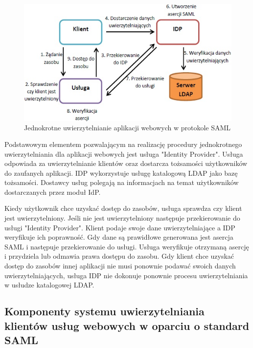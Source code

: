 		\begin{figure}[h]
			\centering
			\includegraphics{img/samlWebSSO.jpg}
			\caption{Jednokrotne uwierzytelnianie aplikacji webowych w protokole SAML}
			\label{Jednokrotne uwierzytelnianie aplikacji webowych w protokole SAML}
		\end{figure}

		Podstawowym elementem pozwalającym na realizację procedury jednokrotnego uwierzytelniania dla aplikacji webowych jest usługa "Identity Provider". Usługa odpowiada za uwierzytelnianie klientów oraz dostarcza tożsamości użytkowników do zaufanych aplikacji. IDP wykorzystuje usługę katalogową LDAP jako bazę tożsamości. Dostawcy usług polegają na informacjach na temat użytkowników dostarczanych przez moduł IdP. 

		Kiedy użytkownik chce uzyskać dostęp do zasobów, usługa sprawdza czy klient jest uwierzytelniony. Jeśli nie jest uwierzytelniony następuje przekierowanie do usługi "Identity Provider". Klient podaje swoje dane uwierzytelniające a IDP weryfikuje ich poprawność. Gdy dane są prawidłowe generowana jest asercja SAML i następuje przekierowanie do usługi. Usługa weryfikuje otrzymaną asercję i przydziela lub odmawia prawa dostępu do zasobu. Gdy klient chce uzyskać dostęp do zasobów innej aplikacji nie musi ponownie podawać swoich danych uwierzytelniających, usługa IDP nie dokonuje ponownie procesu uwierzytelniania w usłudze katalogowej LDAP.

	\subsection{Komponenty systemu uwierzytelniania klientów usług webowych w oparciu o standard SAML}

